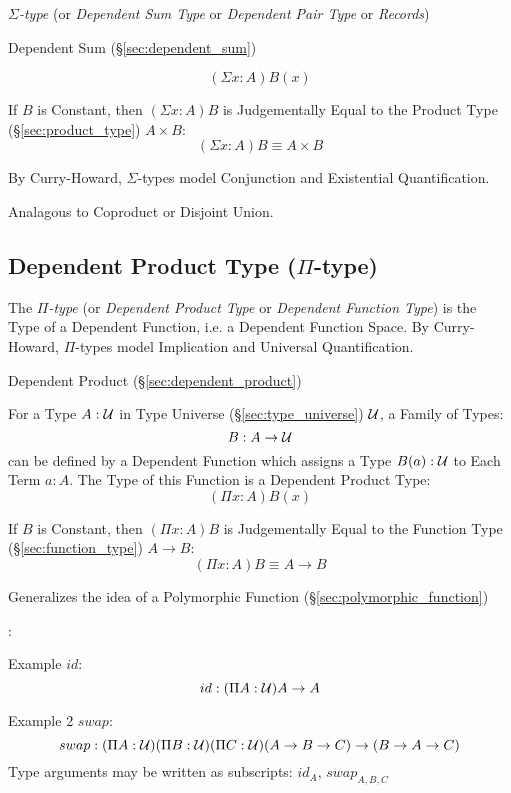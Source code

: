 \emph{$\Sigma$-type} (or \emph{Dependent Sum Type} or \emph{Dependent
  Pair Type} or \emph{Records})

Dependent Sum (\S\ref{sec:dependent_sum})

\[
  (\Sigma x:A) B(x)
\]

If $B$ is Constant, then $(\Sigma x:A)B$ is Judgementally Equal to
the Product Type (\S\ref{sec:product_type}) $A \times B$:
\[
  (\Sigma x:A) B \equiv A \times B
\]

By Curry-Howard, $\Sigma$-types model Conjunction and Existential
Quantification.

Analagous to Coproduct or Disjoint Union.



\subsection{Dependent Product Type ($\Pi$-type)}\label{sec:pi_type}

The \emph{$\Pi$-type} (or \emph{Dependent Product Type} or
\emph{Dependent Function Type}) is the Type of a Dependent Function,
i.e. a Dependent Function Space. By Curry-Howard, $\Pi$-types model
Implication and Universal Quantification.

Dependent Product (\S\ref{sec:dependent_product})

For a Type $A : \mathcal{U}$ in Type Universe
(\S\ref{sec:type_universe}) $\mathcal{U}$, a Family of Types:
\[
  B : A \rightarrow \mathcal{U}
\]
can be defined by a Dependent Function which assigns a Type $B(a) :
\mathcal{U}$ to Each Term $a : A$. The Type of this Function is a
Dependent Product Type:
\[
  (\Pi x:A)B(x)
\]

If $B$ is Constant, then $(\Pi x:A)B$ is Judgementally Equal to the
Function Type (\S\ref{sec:function_type}) $A \rightarrow B$:
\[
  (\Pi x:A)B \equiv A \rightarrow B
\]

Generalizes the idea of a Polymorphic Function
(\S\ref{sec:polymorphic_function})

\cite{hott13}:

Example $id$:
\[
  id : (\Pi A:\mathcal{U}) A \rightarrow A
\]

Example 2 $swap$:
\[
  swap : (\Pi A:\mathcal{U}) (\Pi B:\mathcal{U}) (\Pi C:\mathcal{U})
  (A \rightarrow B \rightarrow C) \rightarrow (B \rightarrow A
  \rightarrow C)
\]
Type arguments may be written as subscripts: $id_A$, $swap_{A,B,C}$


